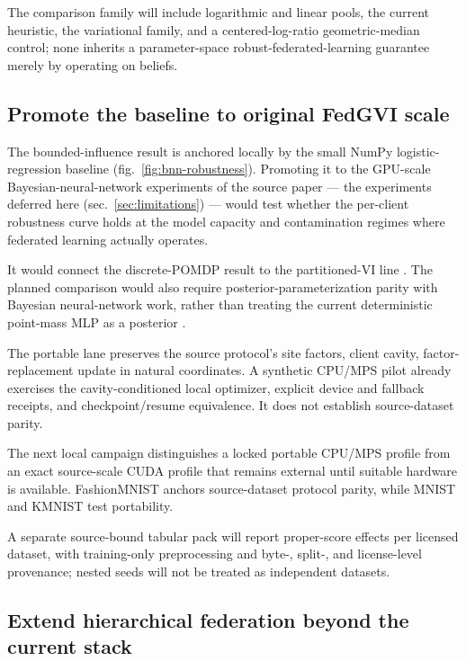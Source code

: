 \documentclass[
  english,
]{article}
\newcounter{none} %
\theoremstyle{plain}
\theoremstyle{definition}
\theoremstyle{remark}
\theoremstyle{definition}
\begin{document}
The comparison family will include logarithmic and linear pools, the
current heuristic, the variational family, and a centered-log-ratio
geometric-median control; none inherits a parameter-space
robust-federated-learning guarantee merely by operating on beliefs.

\subsection{Promote the baseline to original FedGVI
scale}\label{sec:future-scale}

The bounded-influence result is anchored locally by the small NumPy
logistic-regression baseline (fig.~\ref{fig:bnn-robustness}). Promoting
it to the GPU-scale Bayesian-neural-network experiments of the source
paper \citep{mildner2025fedgvi} --- the experiments deferred here
(sec.~\ref{sec:limitations}) --- would test whether the per-client
robustness curve holds at the model capacity and contamination regimes
where federated learning \citep{mcmahan2017communication} actually
operates.

It would connect the discrete-POMDP result to the partitioned-VI line
\citep{ashman2022partitioned, bui2018partitioned}. The planned
comparison would also require posterior-parameterization parity with
Bayesian neural-network work, rather than treating the current
deterministic point-mass MLP as a posterior \citep{mildner2025fedgvi}.

The portable lane preserves the source protocol's site factors, client
cavity, factor-replacement update in natural coordinates. A synthetic
CPU/MPS pilot already exercises the cavity-conditioned local optimizer,
explicit device and fallback receipts, and checkpoint/resume
equivalence. It does not establish source-dataset parity.

The next local campaign distinguishes a locked portable CPU/MPS profile
from an exact source-scale CUDA profile that remains external until
suitable hardware is available. FashionMNIST anchors source-dataset
protocol parity, while MNIST and KMNIST test portability.

A separate source-bound tabular pack will report proper-score effects
per licensed dataset, with training-only preprocessing and byte-,
split-, and license-level provenance; nested seeds will not be treated
as independent datasets.

\subsection{Extend hierarchical federation beyond the current
stack}\label{sec:future-hierarchical}
\end{document}
